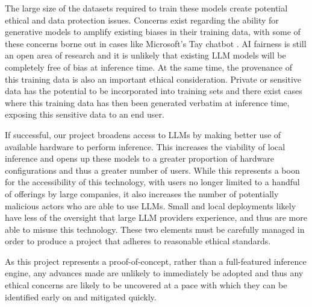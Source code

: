 \documentclass[12pt,twoside]{report}
\begin{document}
The large size of the datasets required to train these models create potential ethical and data protection issues.
Concerns exist regarding the ability for generative models to amplify existing biases in their training data, with some of these concerns borne out in cases like Microsoft's Tay chatbot \cite{tayMicrosoft}.
AI fairness is still an open area of research \cite{xivuri2021systematic} and it is unlikely that existing LLM models will be completely free of bias at inference time.
At the same time, the provenance of this training data is also an important ethical consideration.
Private or sensitive data has the potential to be incorporated into training sets and there exist cases \cite{nasr2023scalable} where this training data has then been generated verbatim at inference time, exposing this sensitive data to an end user.

If successful, our project broadens access to LLMs by making better use of available hardware to perform inference.
This increases the viability of local inference and opens up these models to a greater proportion of hardware configurations and thus a greater number of users.
While this represents a boon for the accessibility of this technology, with users no longer limited to a handful of offerings by large companies, it also increases the number of potentially malicious actors who are able to use LLMs.
Small and local deployments likely have less of the oversight that large LLM providers experience, and thus are more able to misuse this technology.
These two elements must be carefully managed in order to produce a project that adheres to reasonable ethical standards.

As this project represents a proof-of-concept, rather than a full-featured inference engine, any advances made are unlikely to immediately be adopted and thus any ethical concerns are likely to be uncovered at a pace with which they can be identified early on and mitigated quickly.




\end{document}
